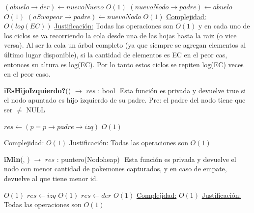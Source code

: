 \begin{Algoritmos}
\begin{algorithmic}[1]
						\Else
							\State $(abuelo \rightarrow der) \gets nuevoNuevo$ \Comment $O(1)$
							\State $(nuevoNodo \rightarrow padre) \gets abuelo$ \Comment $O(1)$
							\State $(aSwapear \rightarrow padre) \gets nuevoNodo$ \Comment $O(1)$
						\EndIf
					\EndIf
					\EndIf
				\EndIf
			\EndIf
			\medskip
			\Statex \underline{Complejidad:} $O(log(EC))$
			\Statex \underline{Justificaci\'on:} Todas las operaciones son $O(1)$ y en cada uno de los ciclos se va recorriendo la cola desde una de las hojas hasta la raiz (o vice versa). Al ser la cola un \'arbol completo (ya que siempre se agregan elementos al \'ultimo lugar disponible), si la cantidad de elementos es EC en el peor cas, entonces su altura es log(EC). Por lo tanto estos ciclos se repiten log(EC) veces en el peor caso.
    	\end{algorithmic}
    	
\begin{algorithm}[H]{\textbf{iEsHijoIzquierdo?}() $\to$ $res$ : bool} $ $\newline
\Comment Esta funci\'on es privada y devuelve true si el nodo apuntado es hijo izquierdo de su padre. Pre: el padre del nodo tiene que ser $\not=$ NULL
    	\begin{algorithmic}[1] 
			 \State $res \gets  (p = p \rightarrow padre \rightarrow izq) $ \Comment $O(1)$

			\medskip
			\Statex \underline{Complejidad:} $O(1)$
			\Statex \underline{Justificaci\'on:} Todas las operaciones son $O(1)$
    	\end{algorithmic}   	
\end{algorithm}

\begin{algorithm}[H]{\textbf{iMin}(, ) $\to$ $res$ : puntero(Nodoheap)}  $ $\newline
\Comment Esta funci\'on es privada y devuelve el nodo con menor cantidad de pokemones capturados, y en caso de empate, devuelve al que tiene menor id.
    	\begin{algorithmic}[1] 
			  \Comment $O(1)$
			 	\State $res \gets izq$ \Comment $O(1)$
			 \Else
			 	\State $res \gets der$ \Comment $O(1)$
			 \EndIf		
			\medskip
			\Statex \underline{Complejidad:} $O(1)$
			\Statex \underline{Justificaci\'on:} Todas las operaciones son $O(1)$ 
    	\end{algorithmic}   	
\end{algorithm}


\end{Algoritmos}
